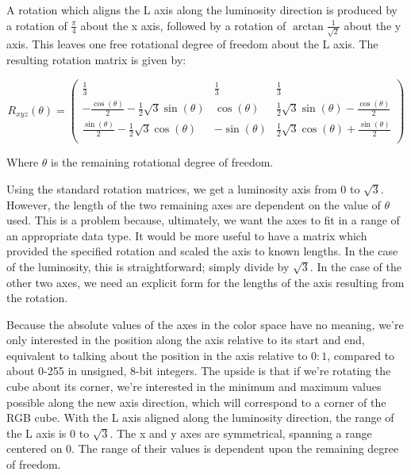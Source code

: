 A rotation which aligns the L axis along the luminosity direction is produced by a rotation of $\frac{\pi}4$ about the x axis, followed by a rotation of $\arctan{\frac{1}{\sqrt{2}}}$ about the y axis. This leaves one free rotational degree of freedom about the L axis. The resulting rotation matrix is given by:

\begin{equation}
R_{xyz}(\theta) =
\left(
\begin{array}{ccc}
 \frac{1}{3} & \frac{1}{3} & \frac{1}{3} \\
 -\frac{\cos (\theta )}{2}-\frac{1}{2} \sqrt{3} \sin (\theta ) & \cos (\theta ) & \frac{1}{2} \sqrt{3} \sin (\theta )-\frac{\cos (\theta )}{2} \\
 \frac{\sin (\theta )}{2}-\frac{1}{2} \sqrt{3} \cos (\theta ) & -\sin (\theta ) & \frac{1}{2} \sqrt{3} \cos (\theta )+\frac{\sin (\theta )}{2} \\
\end{array}
\right)
\end{equation}


Where $\theta$ is the remaining rotational degree of freedom.

Using the standard rotation matrices, we get a luminosity axis from 0 to $\sqrt{3}$. However, the length of the two remaining axes are dependent on the value of $\theta$ used. This is a problem because, ultimately, we want the axes to fit in a range of an appropriate data type. It would be more useful to have a matrix which provided the specified rotation and scaled the axis to known lengths. In the case of the luminosity, this is straightforward; simply divide by $\sqrt{3}$. In the case of the other two axes, we need an explicit form for the lengths of the axis resulting from the rotation.

Because the absolute values of the axes in the color space have no meaning, we're only interested in the position along the axis relative to its start and end, equivalent to talking about the position in the axis relative to $0:1$, compared to about 0-255 in unsigned, 8-bit integers. The upside is that if we're rotating the cube about its corner, we're interested in the minimum and maximum values possible along the new axis direction, which will correspond to a corner of the RGB cube. With the L axis aligned along the luminosity direction, the range of the L axis is 0 to $\sqrt{3}$. The x and y axes are symmetrical, spanning a range centered on 0. The range of their values is dependent upon the remaining degree of freedom.

